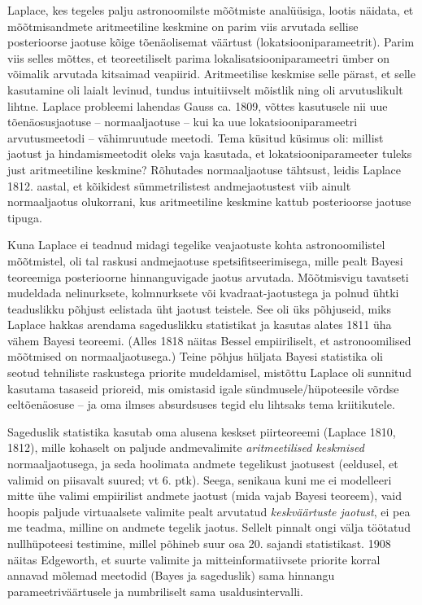 \documentclass[]{book}
\begin{document}
Laplace, kes tegeles palju astronoomilste mõõtmiste analüüsiga, lootis
näidata, et mõõtmisandmete aritmeetiline keskmine on parim viis arvutada
sellise posterioorse jaotuse kõige tõenäolisemat väärtust
(lokatsiooniparameetrit). Parim viis selles mõttes, et teoreetiliselt
parima lokalisatsiooniparameetri ümber on võimalik arvutada kitsaimad
veapiirid. Aritmeetilise keskmise selle pärast, et selle kasutamine oli
laialt levinud, tundus intuitiivselt mõistlik ning oli arvutuslikult
lihtne. Laplace probleemi lahendas Gauss ca. 1809, võttes kasutusele nii
uue tõenäosusjaotuse -- normaaljaotuse -- kui ka uue
lokatsiooniparameetri arvutusmeetodi -- vähimruutude meetodi. Tema
küsitud küsimus oli: millist jaotust ja hindamismeetodit oleks vaja
kasutada, et lokatsiooniparameeter tuleks just aritmeetiline keskmine?
Rõhutades normaaljaotuse tähtsust, leidis Laplace 1812. aastal, et
kõikidest sümmetrilistest andmejaotustest viib ainult normaaljaotus
olukorrani, kus aritmeetiline keskmine kattub posterioorse jaotuse
tipuga.

Kuna Laplace ei teadnud midagi tegelike veajaotuste kohta
astronoomilistel mõõtmistel, oli tal raskusi andmejaotuse
spetsifitseerimisega, mille pealt Bayesi teoreemiga posterioorne
hinnanguvigade jaotus arvutada. Mõõtmisvigu tavatseti mudeldada
nelinurksete, kolmnurksete või kvadraat-jaotustega ja polnud ühtki
teaduslikku põhjust eelistada üht jaotust teistele. See oli üks
põhjuseid, miks Laplace hakkas arendama sageduslikku statistikat ja
kasutas alates 1811 üha vähem Bayesi teoreemi. (Alles 1818 näitas Bessel
empiiriliselt, et astronoomilised mõõtmised on normaaljaotusega.) Teine
põhjus hüljata Bayesi statistika oli seotud tehniliste raskustega
priorite mudeldamisel, mistõttu Laplace oli sunnitud kasutama tasaseid
prioreid, mis omistasid igale sündmusele/hüpoteesile võrdse
eeltõenäosuse -- ja oma ilmses absurdsuses tegid elu lihtsaks tema
kriitikutele.

Sageduslik statistika kasutab oma alusena keskset piirteoreemi (Laplace
1810, 1812), mille kohaselt on paljude andmevalimite
\emph{aritmeetilised keskmised} normaaljaotusega, ja seda hoolimata
andmete tegelikust jaotusest (eeldusel, et valimid on piisavalt suured;
vt 6. ptk). Seega, senikaua kuni me ei modelleeri mitte ühe valimi
empiirilist andmete jaotust (mida vajab Bayesi teoreem), vaid hoopis
paljude virtuaalsete valimite pealt arvutatud \emph{keskväärtuste
jaotust}, ei pea me teadma, milline on andmete tegelik jaotus. Sellelt
pinnalt ongi välja töötatud nullhüpoteesi testimine, millel põhineb suur
osa 20. sajandi statistikast. 1908 näitas Edgeworth, et suurte valimite
ja mitteinformatiivsete priorite korral annavad mõlemad meetodid (Bayes
ja sageduslik) sama hinnangu parameetriväärtusele ja numbriliselt sama
usaldusintervalli.
\end{document}
